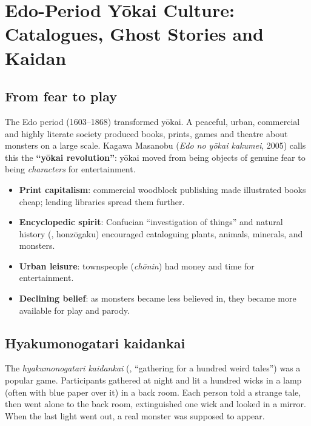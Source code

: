 \chapter{Edo-Period Yōkai Culture: Catalogues, Ghost Stories and Kaidan}

\section{From fear to play}

The Edo period (1603--1868) transformed yōkai. A peaceful, urban, commercial and highly
literate society produced books, prints, games and theatre about monsters on a large scale.
Kagawa Masanobu (\emph{Edo no yōkai kakumei}, 2005) calls this the \textbf{``yōkai
revolution''}: yōkai moved from being objects of genuine fear to being \emph{characters}
for entertainment.

\begin{important}
\begin{itemize}
  \item \textbf{Print capitalism}: commercial woodblock publishing made illustrated books
        cheap; lending libraries spread them further.
  \item \textbf{Encyclopedic spirit}: Confucian ``investigation of things'' and natural
        history (, honzōgaku) encouraged cataloguing plants, animals, minerals,
        and monsters.
  \item \textbf{Urban leisure}: townspeople (\emph{chōnin}) had money and time for
        entertainment.
  \item \textbf{Declining belief}: as monsters became less believed in, they became more
        available for play and parody.
\end{itemize}
\end{important}

\section{Hyakumonogatari kaidankai}

\begin{definition}
The \emph{hyakumonogatari kaidankai} (, ``gathering for a hundred
weird tales'') was a popular game. Participants gathered at night and lit a hundred
wicks in a lamp (often with blue paper over it) in a back room. Each person told a
strange tale, then went alone to the back room, extinguished one wick and looked in a
mirror. When the last light went out, a real monster was supposed to appear.
\end{definition}

